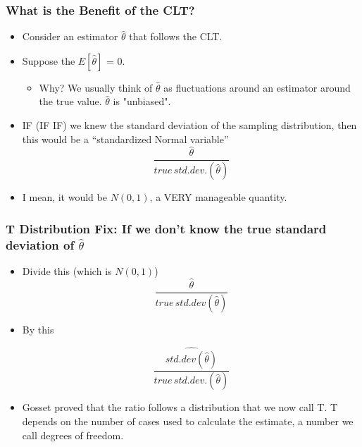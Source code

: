 \documentclass[10pt,english]{beamer}
\begin{document}
\begin{frame}
  \frametitle{What is the Benefit of the CLT?}
  \begin{itemize}
  \item Consider an estimator $\hat{\theta}$ that follows the CLT.
  \item Suppose the $E[\hat{\theta}]$ = 0.
    \begin{itemize}
      \item Why? We usually think of $\hat{\theta}$ as fluctuations around an
      estimator around the true value. $\hat{\theta}$ is "unbiased".
    \end{itemize}
  \item IF (IF IF) we knew the standard deviation of the sampling
    distribution, then this would be a ``standardized Normal variable''
    \begin{equation}
       \frac{\hat{\theta}}{true\, std.dev.(\hat{\theta})}
    \end{equation}
  \item I mean, it would be $N(0,1)$, a VERY manageable quantity.
  \end{itemize}
\end{frame}



\begin{frame}
  \frametitle{T Distribution Fix: If we don't know the true standard deviation of $\hat{\theta}$ }
  \begin{itemize}
  \item Divide this (which is $N(0,1)$)
    \begin{equation}
      \frac{\hat{\theta}}{true\,std.dev(\hat{\theta})}
    \end{equation}
  \item By this

\begin{equation}
\frac{\widehat{std.dev(\hat{\theta})}}{true\, std.dev.(\hat{\theta})}
\end{equation}
  \item Gosset proved that the ratio follows a distribution that we
    now call T.  T depends on the number of cases used to calculate
    the estimate, a number we call degrees of freedom.
  \end{itemize}
\end{frame}
\end{document}
